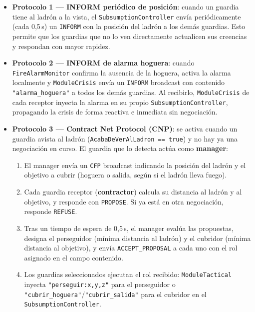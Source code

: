 \documentclass[a4paper,12pt]{article}
\begin{document}
\begin{itemize}

    \item \textbf{Protocolo 1 --- INFORM periódico de posición}: cuando un
    guardia tiene al ladrón a la vista, el \texttt{SubsumptionController}
    envía periódicamente (cada 0,5\,s) un \texttt{INFORM} con la posición del
    ladrón a los demás guardias. Esto permite que los guardias que no lo ven
    directamente actualicen sus creencias y respondan con mayor rapidez.

    \item \textbf{Protocolo 2 --- INFORM de alarma hoguera}: cuando
    \texttt{FireAlarmMonitor} confirma la ausencia de la hoguera, activa la
    alarma localmente y \texttt{ModuleCrisis} envía un \texttt{INFORM}
    broadcast con contenido \texttt{"alarma\_hoguera"} a todos los demás
    guardias. Al recibirlo, \texttt{ModuleCrisis} de cada receptor inyecta la
    alarma en su propio \texttt{SubsumptionController}, propagando la crisis de
    forma reactiva e inmediata sin negociación.

    \item \textbf{Protocolo 3 --- Contract Net Protocol (CNP)}: se activa
    cuando un guardia avista al ladrón (\texttt{AcabaDeVerAlLadron == true}) y
    no hay ya una negociación en curso. El guardia que lo detecta actúa como
    \textbf{manager}:
    \begin{enumerate}
        \item El manager envía un \texttt{CFP} broadcast indicando la posición
        del ladrón y el objetivo a cubrir (hoguera o salida, según si el ladrón
        lleva fuego).
        \item Cada guardia receptor (\textbf{contractor}) calcula su distancia
        al ladrón y al objetivo, y responde con \texttt{PROPOSE}. Si ya está en
        otra negociación, responde \texttt{REFUSE}.
        \item Tras un tiempo de espera de 0,5\,s, el manager evalúa las
        propuestas, designa el perseguidor (mínima distancia al
        ladrón) y el cubridor (mínima distancia al objetivo), y envía
        \texttt{ACCEPT\_PROPOSAL} a cada uno con el rol asignado en el campo
        contenido.
        \item Los guardias seleccionados ejecutan el rol recibido:
        \texttt{ModuleTactical} inyecta \texttt{"perseguir:x,y,z"} para el
        perseguidor o \\ \texttt{"cubrir\_hoguera"}/\texttt{"cubrir\_salida"} para
        el cubridor en el \\ \texttt{SubsumptionController}.
    \end{enumerate}
\end{itemize}
\end{document}
